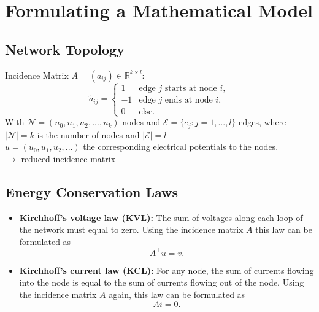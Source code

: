 






\section{Formulating a Mathematical Model}
	\subsection{Network Topology}
	\begin{frame}
		Incidence Matrix $A = (a_{ij}) \in \mathbb{R}^{k \times l}$:
		\begin{displaymath}
			\tilde{a}_{ij} = 
			\begin{cases}
				1 &   \text{edge $j$ starts at node $i$},\\
				-1 &  \text{edge $j$  ends at node $i$},\\
				0 & \text{else}.				
			\end{cases}
		\end{displaymath}
		With $\mathcal{N} = (n_0, n_1, n_2, ..., n_k)$ nodes and $\mathcal{E} = \{e_{j}: j = 1,...,l\}$ edges, where $|\mathcal{N}| = k$ is the number of nodes and $|\mathcal{E}| = l$ \\
		$u = (u_0, u_1, u_2, ...)$ the corresponding electrical potentials to the nodes.\\
		$\to$ reduced incidence matrix
	\end{frame}

	\subsection{Energy Conservation Laws}
	\begin{frame}
		\begin{itemize}
			\item \textbf{Kirchhoff's voltage law (KVL):} \newline
			The sum of voltages along each loop of the network must equal to zero. Using the incidence matrix $A$ this law can be formulated as
			\begin{equation}
				\label{KVL}
				A^\top  u = v.
			\end{equation}
			\item \textbf{Kirchhoff's current law (KCL):} \newline
			For any node, the sum of currents flowing into the node is equal to the sum of currents flowing out of the node. Using the incidence matrix $A$ again, this law can be formulated as
			\begin{equation}
				\label{KCL}
				A  i = 0.
			\end{equation}
		\end{itemize}
	\end{frame}

